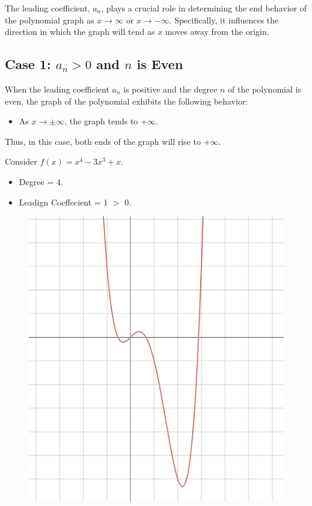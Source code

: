 The leading coefficient, \( a_n \), plays a crucial role in determining the end behavior of the polynomial graph as \( x \to \infty \) or \( x \to -\infty \). Specifically, it influences the direction in which the graph will tend as \( x \) moves away from the origin.

\subsection*{Case 1: \( a_n > 0 \) and \(n\) is Even}

When the leading coefficient \( a_n \) is positive and the degree \( n \) of the polynomial is even, the graph of the polynomial exhibits the following behavior:


\begin{itemize}
    \item As \( x \to \pm \infty \), the graph tends to \( +\infty \).
\end{itemize}

Thus, in this case, both ends of the graph will rise to \( +\infty \). 

\begin{example}
  Consider   \( f(x) = x^4 - 3x^3 + x \).
  \begin{itemize}
  \item Degree = 4.
  \item Leadign Coeffecient = 1 $>$ 0.
  \end{itemize}

\begin{figure}[H]
  \centering
  \includegraphics[scale=0.2]{"./fig/case_1.png"}
\end{figure}
\end{example}


